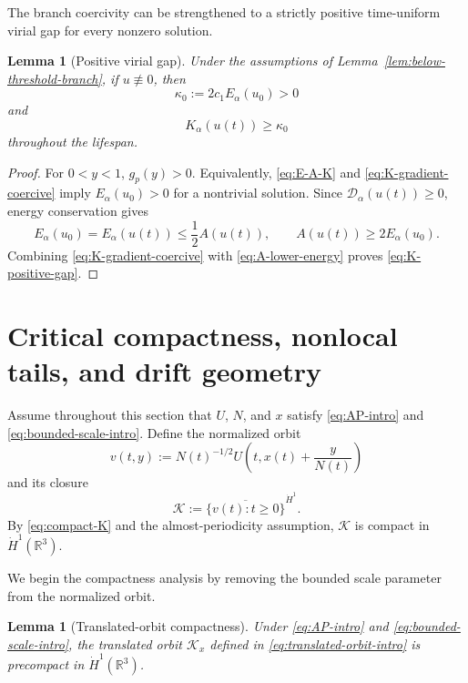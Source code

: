 \documentclass[preprint,12pt]{elsarticle}
\numberwithin{equation}{section}
\newtheorem{lemma}[theorem]{Lemma}
\theoremstyle{remark}
\newcommand{\R}{\mathbb R}
\newcommand{\Dcal}{\mathcal D_{\alpha}}
\newcommand{\Ecal}{E_{\alpha}}
\newcommand{\Kcal}{K_{\alpha}}
\begin{document}
The branch coercivity can be strengthened to a strictly positive time-uniform virial gap for every nonzero solution.

\begin{lemma}[Positive virial gap]\label{lem:positive-virial-gap}
Under the assumptions of Lemma~\ref{lem:below-threshold-branch}, if $u\not\equiv0$, then
\begin{equation}\label{eq:kappa-def}
  \kappa_0:=2c_1\Ecal(u_0)>0
\end{equation}
and
\begin{equation}\label{eq:K-positive-gap}
  \Kcal(u(t))\ge\kappa_0
\end{equation}
throughout the lifespan.
\end{lemma}

\begin{proof}
For $0<y<1$, $g_p(y)>0$. Equivalently, \eqref{eq:E-A-K} and \eqref{eq:K-gradient-coercive} imply $\Ecal(u_0)>0$ for a nontrivial solution. Since $\Dcal(u(t))\ge0$, energy conservation gives
\begin{equation}\label{eq:A-lower-energy}
  \Ecal(u_0)=\Ecal(u(t))\le\frac12A(u(t)),
  \qquad A(u(t))\ge2\Ecal(u_0).
\end{equation}
Combining \eqref{eq:K-gradient-coercive} with \eqref{eq:A-lower-energy} proves \eqref{eq:K-positive-gap}.
\end{proof}

\section{Critical compactness, nonlocal tails, and drift geometry}

Assume throughout this section that $U$, $N$, and $x$ satisfy \eqref{eq:AP-intro} and \eqref{eq:bounded-scale-intro}. Define the normalized orbit
\begin{equation}\label{eq:normalized-orbit}
  v(t,y):=N(t)^{-1/2}U\left(t,x(t)+\frac{y}{N(t)}\right)
\end{equation}
and its closure
\begin{equation}\label{eq:compact-K}
  \mathcal K:=\overline{\{v(t):t\ge0\}}^{\dot H^1}.
\end{equation}
By \eqref{eq:compact-K} and the almost-periodicity assumption, $\mathcal K$ is compact in $\dot H^1(\R^3)$.

We begin the compactness analysis by removing the bounded scale parameter from the normalized orbit.

\begin{lemma}[Translated-orbit compactness]\label{lem:translated-orbit-compact}
Under \eqref{eq:AP-intro} and \eqref{eq:bounded-scale-intro}, the translated orbit $\mathcal K_x$ defined in \eqref{eq:translated-orbit-intro} is precompact in $\dot H^1(\R^3)$.
\end{lemma}
\end{document}
